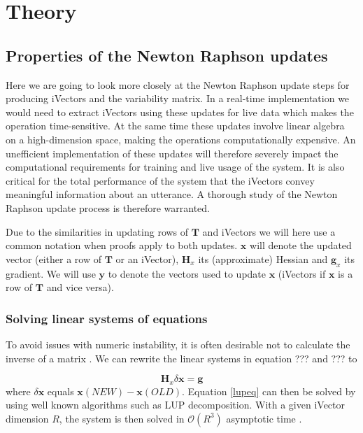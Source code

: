 \chapter{Theory}
\label{sect:Theory}

\section{Properties of the Newton Raphson updates}

Here we are going to look more closely at the Newton Raphson update steps for producing iVectors and the variability matrix. In a real-time implementation we would need to extract iVectors using these updates for live data which makes the operation time-sensitive. At the same time these updates involve linear algebra on a high-dimension space, making the operations computationally expensive. An unefficient implementation of these updates will therefore severely impact the computational requirements for training and live usage of the system. It is also critical for the total performance of the system that the iVectors convey meaningful information about an utterance. A thorough study of the Newton Raphson update process is therefore warranted. 

Due to the similarities in updating rows of $\mathbf{T}$ and iVectors we will here use a common notation when proofs apply to both updates. $\mathbf{x}$ will denote the updated vector (either a row of $\mathbf{T}$ or an iVector), $\mathbf{H}_x$ its (approximate) Hessian and $\mathbf{g}_x$ its gradient. We will use $\mathbf{y}$ to denote the vectors used to update $\mathbf{x}$ (iVectors if $\mathbf{x}$ is a row of $\mathbf{T}$ and vice versa).

\subsection{Solving linear systems of equations}

To avoid issues with numeric instability, it is often desirable not to calculate the inverse of a matrix \cite[p. 743]{cormen}. We can rewrite the linear systems in equation ??? and ??? to

\begin{equation}\label{lupeq}
\mathbf{H}_x\delta\mathbf{x} = \mathbf{g}
\end{equation}
where $\delta\mathbf{x}$ equals $\mathbf{x}(NEW)-\mathbf{x}(OLD)$. Equation \ref{lupeq} can then be solved by using well known algorithms such as LUP decomposition. With a given iVector dimension $R$, the system is then solved in $\mathcal{O}(R^3)$ asymptotic time \cite[p. 754]{cormen}. 

